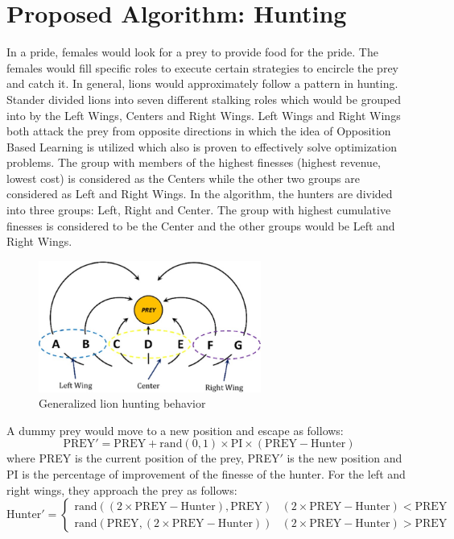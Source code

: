 \section{Proposed Algorithm: Hunting}
In a pride, females would look for a prey to provide food for the pride. The females would fill specific roles to execute certain strategies to encircle the prey and catch it. In general, lions would approximately follow a pattern in hunting. Stander divided lions into seven different stalking roles which would be grouped into by the Left Wings, Centers and Right Wings.
Left Wings and Right Wings both attack the prey from opposite directions in which the idea of Opposition Based Learning is utilized which also is proven to effectively solve optimization problems.
The group with members of the highest finesses (highest revenue, lowest cost) is considered as the Centers while the other two groups are considered as Left and Right Wings.
In the algorithm, the hunters are divided into three groups: Left, Right and Center. The group with highest cumulative finesses is considered to be the Center and the other groups would be Left and Right Wings.
\begin{figure}[h]
\begin{center}
\includegraphics[width=0.65\textwidth]{img/pa/hunting_scheme}
\caption{Generalized lion hunting behavior}
\end{center}
\end{figure}
A dummy prey would move to a new position and escape as follows:
$$\text{PREY}' = \text{PREY} + \text{rand}(0,1) \times \text{PI} \times (\text{PREY} - \text{Hunter})$$
where PREY is the current position of the prey, PREY$'$ is the new position and PI is the percentage of improvement of the finesse of the hunter.
For the left and right wings, they approach the prey as follows:
\[ \text{Hunter}' =  \begin{cases}
      \text{rand}((2 \times \text{PREY} - \text{Hunter}), \text{PREY}) & (2 \times \text{PREY} - \text{Hunter}) < \text{PREY} \\
      \text{rand}(\text{PREY}, (2 \times \text{PREY} - \text{Hunter})) & (2 \times \text{PREY} - \text{Hunter}) > \text{PREY}
   \end{cases}
\]

